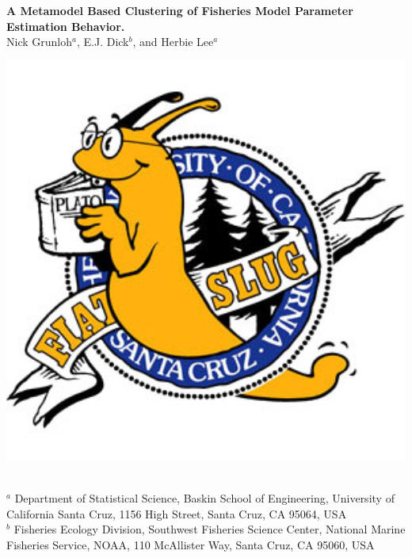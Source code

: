 \documentclass[a0paper,portrait]{baposter}
\begin{document}
\begin{poster}
{\begin{minipage}{0.14\textwidth}
\end{minipage}
\begin{minipage}{0.7\textwidth}
	\begin{center}
	{\huge \textbf{A Metamodel Based Clustering of Fisheries Model Parameter Estimation Behavior.}}\\ %
	\vspace{0.5cm}
	{\Large Nick Grunloh$^a$, E.J. Dick$^b$, and Herbie Lee$^a$}
	\end{center}
\end{minipage}
\begin{minipage}{0.14\textwidth}
	\hspace*{-0.5cm}
	\includegraphics[width=1.2\textwidth]{./fiatSlug.jpg}
\end{minipage}
\normalsize
\\ \sf
$^a$ Department of Statistical Science, Baskin School of Engineering, University of California Santa Cruz, 1156 High Street, Santa Cruz, CA 95064, USA\\
$^b$ Fisheries Ecology Division, Southwest Fisheries Science Center, National Marine Fisheries Service, NOAA, 110 McAllister Way, Santa Cruz, CA 95060, USA\\
}
\\


\end{poster}
\end{document}
